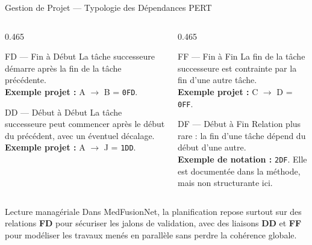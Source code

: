 \begin{frame}{Gestion de Projet --- Typologie des Dépendances PERT}
    \scriptsize
    \setlength{\columnsep}{0.7cm}
    \begin{columns}[T,onlytextwidth]
        \begin{column}{0.465\textwidth}
            \begin{block}{FD --- Fin à Début}
                La tâche successeure démarre après la fin de la tâche précédente.\\
                \textbf{Exemple projet :} A $\rightarrow$ B = \texttt{0FD}.
            \end{block}
            \vspace{0.18cm}
            \begin{block}{DD --- Début à Début}
                La tâche successeure peut commencer après le début du précédent, avec un éventuel décalage.\\
                \textbf{Exemple projet :} A $\rightarrow$ J = \texttt{1DD}.
            \end{block}
        \end{column}
        \begin{column}{0.465\textwidth}
            \begin{block}{FF --- Fin à Fin}
                La fin de la tâche successeure est contrainte par la fin d'une autre tâche.\\
                \textbf{Exemple projet :} C $\rightarrow$ D = \texttt{0FF}.
            \end{block}
            \vspace{0.18cm}
            \begin{block}{DF --- Début à Fin}
                Relation plus rare : la fin d'une tâche dépend du début d'une autre.\\
                \textbf{Exemple de notation :} \texttt{2DF}. Elle est documentée dans la méthode, mais non structurante ici.
            \end{block}
        \end{column}
    \end{columns}

    \vspace{0.12cm}
    \begin{alertblock}{Lecture managériale}
        Dans MedFusionNet, la planification repose surtout sur des relations \textbf{FD} pour sécuriser les jalons de validation, avec des liaisons \textbf{DD} et \textbf{FF} pour modéliser les travaux menés en parallèle sans perdre la cohérence globale.
    \end{alertblock}
\end{frame}

